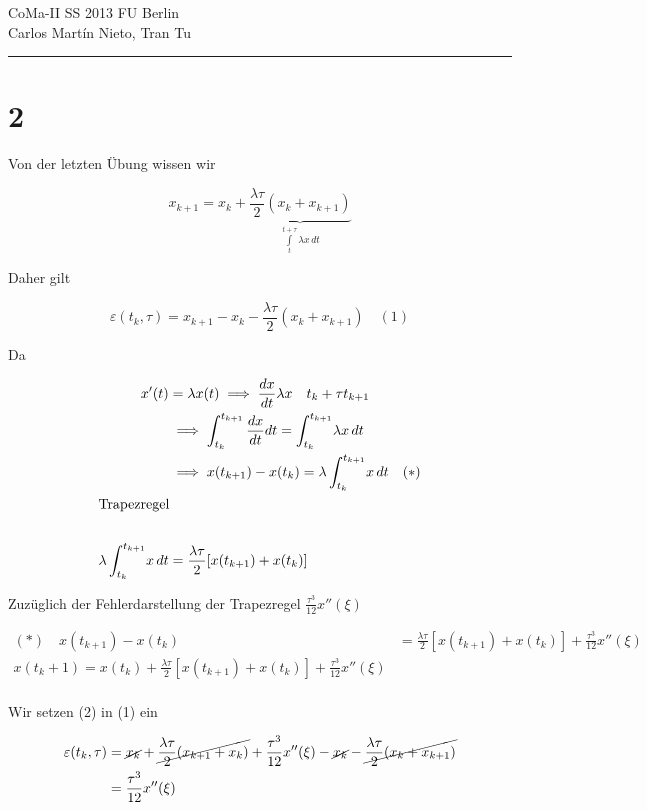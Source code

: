 \documentclass[ngerman,a4paper]{scrartcl}
\begin{document}
{\sffamily
  \hfill
  CoMa-II SS 2013\hfill
  FU Berlin\\[8pt]
  \hfill Carlos Martín Nieto, Tran Tu\hrule \bigskip
}

\section*{2}

Von der letzten Übung wissen wir

\[
x_{k+1} = x_k + \underbrace{\frac{\lambda \tau}{2} (x_k + x_{k+1})}_{\int\limits^{t+\tau}_t \lambda x \, dt}
\]

Daher gilt

\[
\varepsilon(t_k, \tau) = x_{k+1} - x_k - \frac{\lambda\tau}{2} (x_k + x_{k+1}) \quad (1)
\]

Da


\begin{align*}
  x'(t) &= \lambda x(t) \implies \frac{dx}{dt} \lambda x \quad t_k +
  \tau t_{k+1}\\
  &\implies \int^{t_{k+1}}_{t_k} \frac{dx}{dt} dt = \int^{t_{k+1}}_{t_k} \! \lambda x\, dt\\
  &\implies x(t_{k+1}) - x(t_k) = \lambda \int^{t_{k+1}}_{t_k} \! x\, dt \quad (*)\\
  \intertext{Trapezregel}\\
  \lambda \int^{t_{k+1}}_{t_k} \! x\, dt &= \frac{\lambda\tau}{2} [x(t_{k+1}) + x(t_k)]
\end{align*}

Zuzüglich der Fehlerdarstellung der Trapezregel $\frac{\tau^3}{12}x''(\xi)$


\begin{align*}
  (*) \quad x(t_{k+1}) - x(t_k) &= \frac{\lambda\tau}{2}[x(t_{k+1}) +
  x(t_k)] + \frac{\tau^3}{12} x''(\xi)\\
  x(t_k + 1) = x(t_k) + \frac{\lambda\tau}{2} [x(t_{k+1}) +
  x(t_k)] + \frac{\tau^3}{12} x''(\xi)\\
\end{align*}

Wir setzen (2) in (1) ein

\begin{align*}
  \varepsilon(t_k, \tau) &= \cancel{x_k} + \cancel{\frac{\lambda\tau}{2} (x_{k+1} + x_k)}
  + \frac{\tau^3}{12} x''(\xi) - \cancel{x_k} - \cancel{\frac{\lambda\tau}{2} (x_{k} + x_{k+1})}\\
  &= \frac{\tau^3}{12} x''(\xi)
\end{align*}
\end{document}
